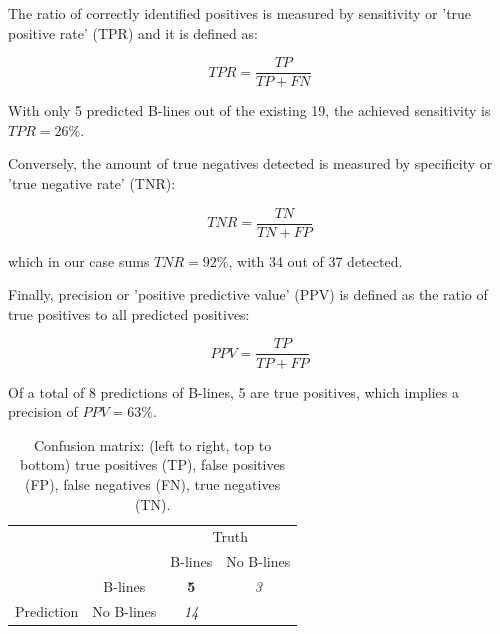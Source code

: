 \documentclass[11pt]{article} %
\begin{document}
	The ratio of correctly identified positives is measured by sensitivity or 'true positive rate' (TPR) and it is defined as:
	
	\[ TPR = \frac{TP}{TP + FN} \]
	
	With only 5 predicted B-lines out of the existing 19, the achieved sensitivity is $ TPR = 26 \% $.

	Conversely, the amount of true negatives detected is measured by specificity or 'true negative rate' (TNR):
	
	\[ TNR = \frac{TN}{TN + FP} \]
	
	which in our case sums $ TNR = 92\%$, with 34 out of 37 detected.
	
	Finally, precision or 'positive predictive value' (PPV) is defined as the ratio of true positives to all predicted positives:
	
	\[ 	PPV = \frac{TP}{TP + FP} \]
	
	 Of a total of 8 predictions of B-lines, 5 are true positives, which implies a precision of $ PPV = 63\% $.
	

\begin{table}[]
\centering
\begin{tabular}{cccc}
\multicolumn{2}{c}{}                                                                & \multicolumn{2}{c}{Truth}                                                                                                                  \\ \cline{3-4} 
\multicolumn{2}{c}{\multirow{-2}{*}{}}                                              & \multicolumn{1}{c|}{B-lines}                             & \multicolumn{1}{c|}{No B-lines}                                                 \\ \cline{2-4} 
\multicolumn{1}{c|}{}                             & \multicolumn{1}{c|}{B-lines}    & \multicolumn{1}{c|}{\cellcolor[HTML]{3399FF}\textbf{5}}  & \multicolumn{1}{c|}{\cellcolor[HTML]{FF9933}\textit{3}}                         \\ \cline{2-4} 
\multicolumn{1}{c|}{\multirow{-2}{*}{Prediction}} & \multicolumn{1}{c|}{No B-lines} & \multicolumn{1}{c|}{\cellcolor[HTML]{3399FF}\textit{14}} & \multicolumn{1}{c|}{\cellcolor[HTML]{FF9933}{\color[HTML]{333333} \textbf{34}}} \\ \cline{2-4} 
\end{tabular}
\caption{Confusion matrix: (left to right, top to bottom) true positives (TP), false positives (FP), false negatives (FN), true negatives (TN).}
\end{table}
	
\end{document}

